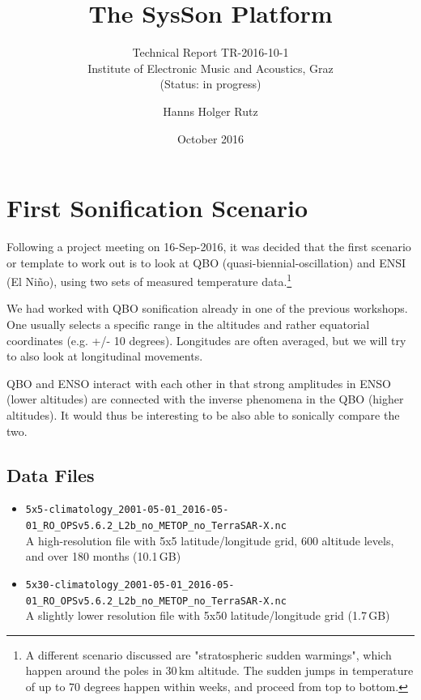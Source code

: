 \documentclass[11pt,a4paper]{article}
\title{The SysSon Platform}
\subtitle{Technical Report TR-2016-10-1\\Institute of Electronic Music and Acoustics, Graz\\(Status: in progress)}
\author{Hanns Holger Rutz}
\date{October 2016}
\begin{document}
\maketitle
{}
\thispagestyle{empty}
\newpage
\section{First Sonification Scenario}

Following a project meeting on 16-Sep-2016, it was decided that the first scenario or template to work out is to look at QBO (quasi-biennial-oscillation) and ENSI (El Niño), using two sets of measured temperature data.\footnote{%
A different scenario discussed are "stratospheric sudden warmings", which happen around the poles in 30\,km altitude. The sudden jumps in temperature of up to 70 degrees happen within  weeks, and proceed from top to bottom.%
}

We had worked with QBO sonification already in one of the previous workshops. One usually selects a specific range in the altitudes and rather equatorial coordinates (e.g. +/- 10 degrees). Longitudes are often averaged, but we will try to also look at longitudinal movements.

QBO and ENSO interact with each other in that strong amplitudes in ENSO (lower altitudes) are connected with the inverse phenomena in the QBO (higher altitudes). It would thus be interesting to be also able to sonically compare the two.

\subsection{Data Files}

\begin{itemize}
\item {\small \Verb!5x5-climatology_2001-05-01_2016-05-01_RO_OPSv5.6.2_L2b_no_METOP_no_TerraSAR-X.nc!}\\A high-resolution file with 5x5 latitude/longitude grid, 600 altitude levels, and over 180 months (10.1\,GB)
\item {\small \Verb!5x30-climatology_2001-05-01_2016-05-01_RO_OPSv5.6.2_L2b_no_METOP_no_TerraSAR-X.nc!}\\A slightly lower resolution file with 5x50 latitude/longitude grid (1.7\,GB)
\end{itemize}
\end{document}
